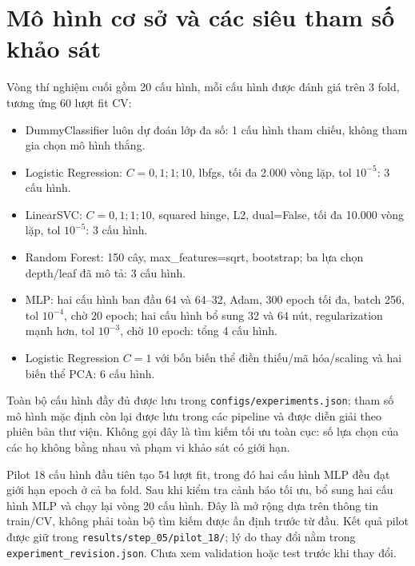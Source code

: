 \section{Mô hình cơ sở và các siêu tham số khảo sát}
\label{sec:5_3}
Vòng thí nghiệm cuối gồm 20 cấu hình, mỗi cấu hình được đánh giá trên 3 fold, tương ứng 60 lượt fit CV:
\begin{itemize}
\item DummyClassifier luôn dự đoán lớp đa số: 1 cấu hình tham chiếu, không tham gia chọn mô hình thắng.
\item Logistic Regression: $C=0{,}1;1;10$, lbfgs, tối đa 2.000 vòng lặp, tol $10^{-5}$: 3 cấu hình.
\item LinearSVC: $C=0{,}1;1;10$, squared hinge, L2, dual=False, tối đa 10.000 vòng lặp, tol $10^{-5}$: 3 cấu hình.
\item Random Forest: 150 cây, max\_features=sqrt, bootstrap; ba lựa chọn depth/leaf đã mô tả: 3 cấu hình.
\item MLP: hai cấu hình ban đầu 64 và 64--32, Adam, 300 epoch tối đa, batch 256, tol $10^{-4}$, chờ 20 epoch; hai cấu hình bổ sung 32 và 64 nút, regularization mạnh hơn, tol $10^{-3}$, chờ 10 epoch: tổng 4 cấu hình.
\item Logistic Regression $C=1$ với bốn biến thể điền thiếu/mã hóa/scaling và hai biến thể PCA: 6 cấu hình.
\end{itemize}
Toàn bộ cấu hình đầy đủ được lưu trong \texttt{configs/experiments.json}; tham số mô hình mặc định còn lại được lưu trong các pipeline và được diễn giải theo phiên bản thư viện. Không gọi đây là tìm kiếm tối ưu toàn cục: số lựa chọn của các họ không bằng nhau và phạm vi khảo sát có giới hạn.

Pilot 18 cấu hình đầu tiên tạo 54 lượt fit, trong đó hai cấu hình MLP đều đạt giới hạn epoch ở cả ba fold. Sau khi kiểm tra cảnh báo tối ưu, bổ sung hai cấu hình MLP và chạy lại vòng 20 cấu hình. Đây là mở rộng dựa trên thông tin train/CV, không phải toàn bộ tìm kiếm được ấn định trước từ đầu. Kết quả pilot được giữ trong \texttt{results/step\_05/pilot\_18/}; lý do thay đổi nằm trong \texttt{experiment\_revision.json}. Chưa xem validation hoặc test trước khi thay đổi.
